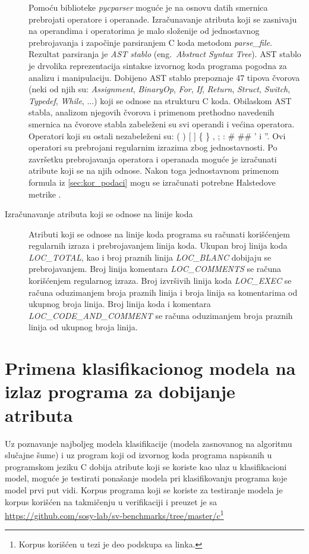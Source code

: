 \documentclass[12pt,oneside]{memoir}
\begin{document}
\begin{description}
Pomoću biblioteke \textit{pycparser} moguće je na osnovu datih smernica prebrojati operatore i operanade. Izračunavanje atributa koji se zasnivaju na operandima i operatorima je malo složenije od jednostavnog prebrojavanja i započinje parsiranjem C koda metodom \textit{parse\_file}. Rezultat parsiranja je \textit{AST stablo} (eng.~\textit{Abstract Syntax Tree}). AST stablo je drvolika reprezentacija sintakse izvornog koda programa pogodna za analizu i manipulaciju. Dobijeno AST stablo prepoznaje 47 tipova čvorova (neki od njih su: \textit{Assignment}, \textit{BinaryOp}, \textit{For}, \textit{If}, \textit{Return}, \textit{Struct}, \textit{Switch}, \textit{Typedef}, \textit{While}, ...) koji se odnose na strukturu C koda. Obilaskom AST stabla, analizom njegovih čvorova i primenom prethodno navedenih smernica na čvorove stabla zabeleženi su svi operandi i većina operatora. Operatori koji su ostali nezabeleženi su: ( ) [ ] \{ \} , ; : \# \#\# ' i ''. Ovi operatori su prebrojani regularnim izrazima zbog jednostavnosti. Po završetku prebrojavanja operatora i operanada moguće je izračunati atribute koji se na njih odnose. Nakon toga jednostavnom primenom formula iz \ref{sec:kor_podaci} mogu se izračunati potrebne Halstedove metrike \cite{pycparser}.

\item[Izračunavanje atributa koji se odnose na linije koda]

Atributi koji se odnose na linije koda programa su računati korišćenjem regularnih izraza i prebrojavanjem linija koda. Ukupan broj linija koda \textit{LOC\_TOTAL}, kao i broj praznih linija \textit{LOC\_BLANC} dobijaju se prebrojavanjem. Broj linija komentara \textit{LOC\_COMMENTS} se računa korišćenjem regularnog izraza. Broj izvršivih linija koda \textit{LOC\_EXEC} se računa oduzimanjem broja praznih linija i broja linija sa komentarima od ukupnog broja linija. Broj linija koda i komentara \textit{LOC\_CODE\_AND\_COMMENT} se računa oduzimanjem broja praznih linija od ukupnog broja linija.


\end{description}

\section{Primena klasifikacionog modela na izlaz programa za dobijanje atributa}
\label{sec:primena modela}

Uz poznavanje najboljeg modela klasifikacije (modela zasnovanog na algoritmu slučajne šume) i uz program koji od izvornog koda programa napisanih u programskom jeziku C dobija atribute koji se koriste kao ulaz u klasifikacioni model, moguće je testirati ponašanje modela pri klasifikovanju programa koje model prvi put vidi. Korpus programa koji se koriste za testiranje modela je korpus korišćen na takmičenju u verifikaciji i preuzet je sa \url{https://github.com/sosy-lab/sv-benchmarks/tree/master/c}\footnote{Korpus korišćen u tezi je deo podskupa sa linka.}
\end{document}
